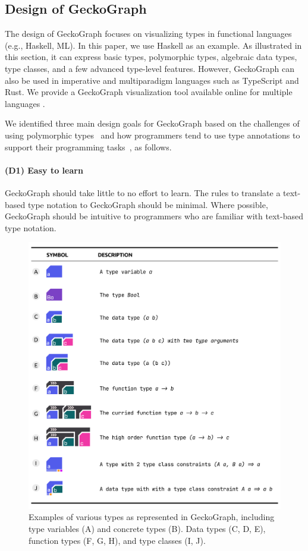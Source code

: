 \documentclass[preprint,12pt]{elsarticle}
\begin{document}
\subsection{Design of GeckoGraph}
The design of GeckoGraph focuses on visualizing types in functional languages (e.g., Haskell, ML). In this paper, we use Haskell as an example. As illustrated in this section, it can express basic types, polymorphic types, algebraic data types, type classes, and a few advanced type-level features. However, GeckoGraph can also be used in imperative and multiparadigm languages such as TypeScript and Rust. We provide a GeckoGraph visualization tool available online for multiple languages \cite{Fu2025-ka}.

We identified three main design goals for GeckoGraph based on the challenges of using polymorphic types~\cite{Jun2000-ec, Jun2000-yu} and how programmers tend to use type annotations to support their programming tasks~\cite{Justin_Lubin2021-yy}, as follows. 

\paragraph{\textbf{(D1) Easy to learn}}\label{goal1} GeckoGraph should take little to no effort to learn. The rules to translate a text-based type notation to GeckoGraph should be minimal. Where possible, GeckoGraph should be intuitive to programmers who are familiar with text-based type notation.

\begin{figure}[!h]
  \includegraphics[width=\linewidth]{figures/Design}
  \caption{
        \label{fig:design}
        Examples of various types as represented in GeckoGraph, including type variables (A) and concrete types (B). Data types (C, D, E), function types (F, G, H), and type classes (I, J).
  }
\end{figure}
\end{document}
